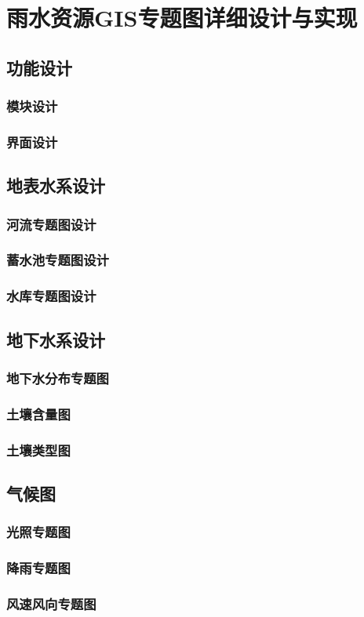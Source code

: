 
\chapter{雨水资源GIS专题图详细设计与实现}

\section{功能设计}
\subsection{模块设计}
\subsection{界面设计}


\section{地表水系设计}
\subsection{河流专题图设计}
\subsection{蓄水池专题图设计}
\subsection{水库专题图设计}
\section{地下水系设计}
\subsection{地下水分布专题图}
\subsection{土壤含量图}
\subsection{土壤类型图}
\section{气候图}
\subsection{光照专题图}
\subsection{降雨专题图}
\subsection{风速风向专题图}


